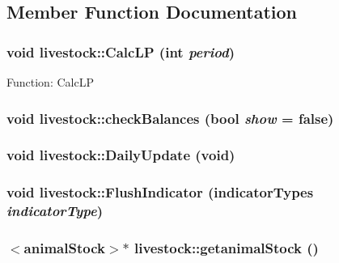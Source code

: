 \subsection{Member Function Documentation}
\hypertarget{classlivestock_a34799a6605eb906b492063c2ba2c5a2f}{
\subsubsection[{CalcLP}]{\setlength{\rightskip}{0pt plus 5cm}void livestock::CalcLP (int {\em period})}}
\label{classlivestock_a34799a6605eb906b492063c2ba2c5a2f}
Function: CalcLP \hypertarget{classlivestock_a943ce10cdce6cdbba61e39bdae6dea8e}{
\subsubsection[{checkBalances}]{\setlength{\rightskip}{0pt plus 5cm}void livestock::checkBalances (bool {\em show} = {\ttfamily false})}}
\label{classlivestock_a943ce10cdce6cdbba61e39bdae6dea8e}
\hypertarget{classlivestock_a76b9eb4389d589791cc8fbd6a6551c07}{
\subsubsection[{DailyUpdate}]{\setlength{\rightskip}{0pt plus 5cm}void livestock::DailyUpdate (void)}}
\label{classlivestock_a76b9eb4389d589791cc8fbd6a6551c07}
\hypertarget{classlivestock_a1a71246b0cb2650ea78da26ad87ca4f9}{
\subsubsection[{FlushIndicator}]{\setlength{\rightskip}{0pt plus 5cm}void livestock::FlushIndicator ({\bf indicatorTypes} {\em indicatorType})}}
\label{classlivestock_a1a71246b0cb2650ea78da26ad87ca4f9}
\hypertarget{classlivestock_a99ae9948a427d2119fbc60ee9a64bf75}{
\subsubsection[{getanimalStock}]{$<${\bf animalStock}$>$$\ast$ livestock::getanimalStock ()}}
